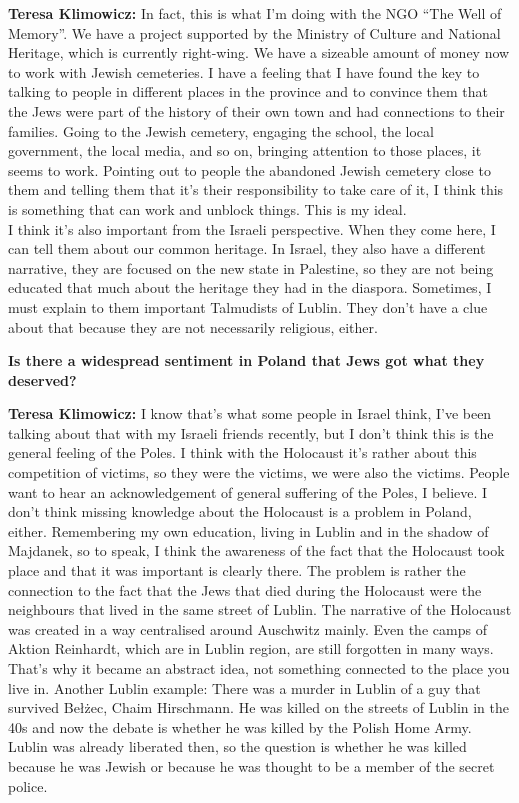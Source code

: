 \textbf{Teresa Klimowicz:} In fact, this is what I'm doing with the NGO ``The Well of Memory''. We have a project supported by the Ministry of Culture and National Heritage, which is currently right-wing. We have a sizeable amount of money now to work with Jewish cemeteries. I have a feeling that I have found the key to talking to people in different places in the province and to convince them that the Jews were part of the history of their own town and had connections to their families. Going to the Jewish cemetery, engaging the school, the local government, the local media, and so on, bringing attention to those places, it seems to work. Pointing out to people the abandoned Jewish cemetery close to them and telling them that it's their responsibility to take care of it, I think this is something that can work and unblock things. This is my ideal.\\ 
I think it's also important from the Israeli perspective. When they come here, I can tell them about our common heritage. In Israel, they also have a different narrative, they are focused on the new state in Palestine, so they are not being educated that much about the heritage they had in the diaspora. Sometimes, I must explain to them important Talmudists of Lublin. They don't have a clue about that because they are not necessarily religious, either. 

\textbf{Is there a widespread sentiment in Poland that Jews got what they deserved?}

\textbf{Teresa Klimowicz:} I know that's what some people in Israel think, I've been talking about that with my Israeli friends recently, but I don't think this is the general feeling of the Poles. I think with the Holocaust it’s rather about this competition of victims, so they were the victims, we were also the victims. People want to hear an acknowledgement of general suffering of the Poles, I believe. I don't think missing knowledge about the Holocaust is a problem in Poland, either. Remembering my own education, living in Lublin and in the shadow of Majdanek, so to speak, I think the awareness of the fact that the Holocaust took place and that it was important is clearly there. The problem is rather the connection to the fact that the Jews that died during the Holocaust were the neighbours that lived in the same street of Lublin. The narrative of the Holocaust was created in a way centralised around Auschwitz mainly. Even the camps of Aktion Reinhardt, which are in Lublin region, are still forgotten in many ways. That's why it became an abstract idea, not something connected to the place you live in. Another Lublin example: There was a murder in Lublin of a guy that survived Bełżec, Chaim Hirschmann. He was killed on the streets of Lublin in the 40s and now the debate is whether he was killed by the Polish Home Army. Lublin was already liberated then, so the question is whether he was killed because he was Jewish or because he was thought to be a member of the secret police.  


